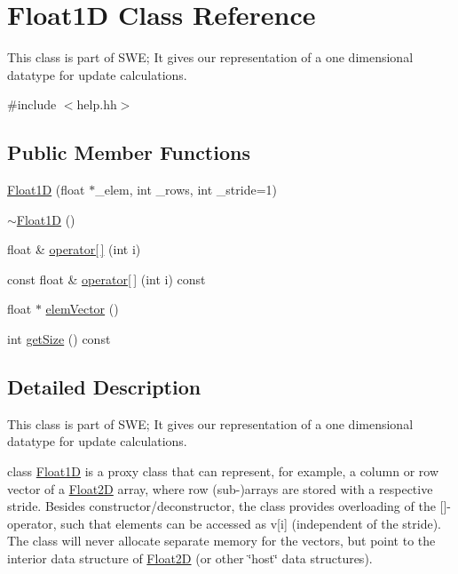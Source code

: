 \hypertarget{classFloat1D}{}\section{Float1D Class Reference}
\label{classFloat1D}


This class is part of S\+WE; It gives our representation of a one dimensional datatype for update calculations.  




{\ttfamily \#include $<$help.\+hh$>$}

\subsection*{Public Member Functions}
\begin{DoxyCompactItemize}
\item 
\hyperlink{classFloat1D_abac72fb922ec7c6d05818be856ede9a2}{Float1D} (float $\ast$\+\_\+elem, int \+\_\+rows, int \+\_\+stride=1)
\item 
\hyperlink{classFloat1D_a1ff981ee146356345deaf93070ca5664}{$\sim$\+Float1D} ()
\item 
float \& \hyperlink{classFloat1D_a4602b1598eaf2e130a55df93b9723e91}{operator\mbox{[}$\,$\mbox{]}} (int i)
\item 
const float \& \hyperlink{classFloat1D_af3356b364d5ff56f3740729724da0467}{operator\mbox{[}$\,$\mbox{]}} (int i) const 
\item 
float $\ast$ \hyperlink{classFloat1D_a2e7889e514588f539a8dc47c75e70601}{elem\+Vector} ()
\item 
int \hyperlink{classFloat1D_a247a2e783f7300467c55fa2e7b19aa43}{get\+Size} () const 
\end{DoxyCompactItemize}


\subsection{Detailed Description}
This class is part of S\+WE; It gives our representation of a one dimensional datatype for update calculations. 

class \hyperlink{classFloat1D}{Float1D} is a proxy class that can represent, for example, a column or row vector of a \hyperlink{classFloat2D}{Float2D} array, where row (sub-\/)arrays are stored with a respective stride. Besides constructor/deconstructor, the class provides overloading of the \mbox{[}\mbox{]}-\/operator, such that elements can be accessed as v\mbox{[}i\mbox{]} (independent of the stride). The class will never allocate separate memory for the vectors, but point to the interior data structure of \hyperlink{classFloat2D}{Float2D} (or other \char`\"{}host\char`\"{} data structures). 

